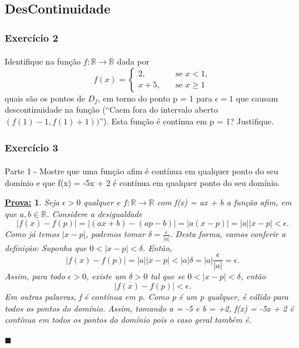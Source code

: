 \documentclass{article}
\newtheorem*{proof*}{\underline{Prova:}}
\renewcommand\qedsymbol{$\blacksquare$}
\begin{document}
\subsection{DesContinuidade}
\subsubsection{Exerc\'icio 2}
\paragraph{} Identifique na fun\c c\~ao $f:\mathbb{R}\rightarrow\mathbb{R}$ dada por 
$$
f(x) = \left\{\begin{array}{ll}
		2, & \quad \text{se } x < 1,\\
		x + 5, & \quad \text{se } x\geq 1
\end{array}\right.
$$
quais s\~ao os pontos de $D_f$, em torno do ponto p = 1 para $\epsilon = 1$ que causam descontinuidade na fun\c c\~ao (``Caem fora do intervalo aberto $(f(1) - 1, f(1)+ 1))$''). Esta fun\c c\~ao \'e cont\'inua em p = 1? Justifique. 

\subsubsection{Exerc\'icio 3} 
\paragraph{} Parte 1 - Mostre que uma fun\c c\~ao afim \'e cont\'inua em qualquer ponto do seu dom\'inio e que f(x) = -5x + 2 \'e cont\'inua em qualquer ponto do seu dom\'inio.
\begin{proof*}
Seja $\epsilon > 0$ qualquer e $f:\mathbb{R}\rightarrow\mathbb{R}$ com f(x) = ax + b a fun\c c\~ao afim, em que $a, b\in\mathbb{R}$. Considere a desigualdade 
$$
|f(x) - f(p)| = |(ax + b) - (ap - b)| = |a(x - p)| = |a||x - p|< \epsilon.
$$
Como j\'a temos $|x - p|$, podemos tomar $\delta = \frac{\epsilon}{|a|}.$ Desta forma, vamos conferir a defini\c c\~ao: Suponha que $0 < |x - p| < \delta.$ Ent\~ao, 
$$
|f(x) - f(p)| = |a||x - p| < |a|\delta = |a|\frac{\epsilon}{|a|} = \epsilon.
$$
Assim, para todo $\epsilon > 0$, existe um $\delta > 0$ tal que se $0 < |x - p| < \delta$, ent\~ao
$$
|f(x) - f(p)| < \epsilon.
$$
Em outras palavras, f \'e cont\'inua em p. Como p \'e um p qualquer, \'e v\'alido para todos os pontos do dom\'inio. Assim, tomando a = -5 e b = +2, f(x) = -5x + 2 \'e cont\'inua em todos os pontos do dom\'inio pois o caso geral tamb\'em \'e.

\qedsymbol
\end{proof*}
\end{document}
